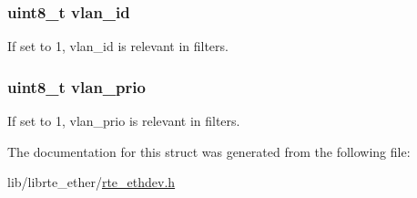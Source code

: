 \subsubsection[{vlan\+\_\+id}]{\setlength{\rightskip}{0pt plus 5cm}uint8\+\_\+t vlan\+\_\+id}\label{structrte__fdir__masks_a755be91194d1d3bbabb65aa290b91990}
If set to 1, vlan\+\_\+id is relevant in filters. \hypertarget{structrte__fdir__masks_ad610cf166351ae7e837556d09a88a15c}{}
\subsubsection[{vlan\+\_\+prio}]{\setlength{\rightskip}{0pt plus 5cm}uint8\+\_\+t vlan\+\_\+prio}\label{structrte__fdir__masks_ad610cf166351ae7e837556d09a88a15c}
If set to 1, vlan\+\_\+prio is relevant in filters. 

The documentation for this struct was generated from the following file\+:\begin{DoxyCompactItemize}
\item 
lib/librte\+\_\+ether/\hyperlink{rte__ethdev_8h}{rte\+\_\+ethdev.\+h}\end{DoxyCompactItemize}
